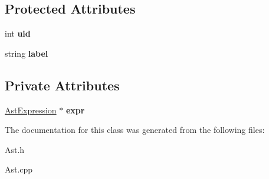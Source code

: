 \subsection*{Protected Attributes}
\begin{DoxyCompactItemize}
\item 
\hypertarget{classAST_a847b778f1c3dd5a19de32de432ee6e15}{int {\bfseries uid}}\label{classAST_a847b778f1c3dd5a19de32de432ee6e15}

\item 
\hypertarget{classAST_ab2e239ccc0688d2341724432ff5a1a31}{string {\bfseries label}}\label{classAST_ab2e239ccc0688d2341724432ff5a1a31}

\end{DoxyCompactItemize}
\subsection*{Private Attributes}
\begin{DoxyCompactItemize}
\item 
\hypertarget{classAstExprStmt_adfa1e352a186eb5869297474d5388e82}{\hyperlink{classAstExpression}{Ast\-Expression} $\ast$ {\bfseries expr}}\label{classAstExprStmt_adfa1e352a186eb5869297474d5388e82}

\end{DoxyCompactItemize}


The documentation for this class was generated from the following files\-:\begin{DoxyCompactItemize}
\item 
Ast.\-h\item 
Ast.\-cpp\end{DoxyCompactItemize}
